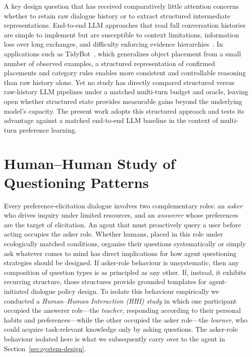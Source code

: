 \documentclass[manuscript,review,anonymous]{acmart}
\begin{document}
A key design question that has received comparatively little attention concerns whether to retain raw dialogue history or to extract structured intermediate representations. End-to-end LLM approaches that read full conversation histories are simple to implement but are susceptible to context limitations, information loss over long exchanges, and difficulty enforcing evidence hierarchies~\cite{tyshka2023interactive}. In applications such as TidyBot~\cite{wu2023tidybot}, which generalizes object placement from a small number of observed examples, a structured representation of confirmed placements and category rules enables more consistent and controllable reasoning than raw history alone. Yet no study has directly compared structured versus raw-history LLM pipelines under a matched multi-turn budget and oracle, leaving open whether structured state provides measurable gains beyond the underlying model's capacity. The present work adopts this structured approach and tests its advantage against a matched end-to-end LLM baseline in the context of multi-turn preference learning.

\section{Human--Human Study of Questioning Patterns}
\label{sec:hhi}

Every preference-elicitation dialogue involves two complementary roles: an \textit{asker} who drives inquiry under limited resources, and an \textit{answerer} whose preferences are the target of elicitation. An agent that must proactively query a user before acting occupies the asker role. Whether humans, placed in this role under ecologically matched conditions, organise their questions systematically or simply ask whatever comes to mind has direct implications for how agent questioning strategies should be designed. If asker-role behaviour is unsystematic, then any composition of question types is as principled as any other. If, instead, it exhibits recurring structure, those structures provide grounded templates for agent-initiated dialogue policy design. To isolate this behaviour empirically we conducted a \textit{Human--Human Interaction (HHI) study} in which one participant occupied the answerer role---the \textit{teacher}, responding according to their personal habits and preferences---while the other occupied the asker role---the \textit{learner}, who could acquire task-relevant knowledge only by asking questions. The asker-role behaviour isolated here is what we subsequently carry over to the agent in Section~\ref{sec:system-design}.
\end{document}
